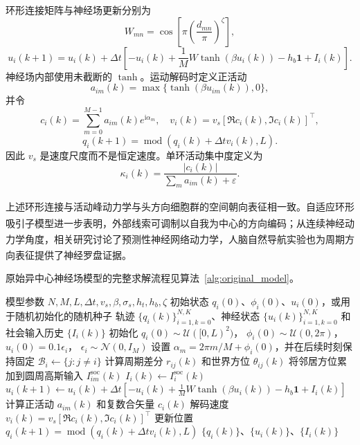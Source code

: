 \documentclass[UTF8,fontset=windows,11pt]{ctexart}
\newcommand{\upcite}[1]{\textsuperscript{\cite{#1}}}
\begin{document}
环形连接矩阵与神经场更新分别为
\begin{equation}
 W_{mn}=\cos\left[\pi\left(\frac{d_{mn}}{\pi}\right)^\zeta\right],
\end{equation}
\begin{equation}
 u_i(k+1)=u_i(k)+\Delta t\left[-u_i(k)+\frac{1}{M}W\tanh(\beta u_i(k))-h_b\bm 1+I_i(k)\right].
\end{equation}
神经场内部使用未截断的 $\tanh$。运动解码时定义正活动
\begin{equation}
 a_{im}(k)=\max\{\tanh(\beta u_{im}(k)),0\},
\end{equation}
并令
\begin{equation}
 c_i(k)=\sum_{m=0}^{M-1}a_{im}(k)e^{\mathrm i\alpha_m},
\quad
 v_i(k)=v_s[\Re c_i(k),\Im c_i(k)]^\top,
\end{equation}
\begin{equation}
 q_i(k+1)=\operatorname{mod}(q_i(k)+\Delta t v_i(k),L).
\end{equation}
因此 $v_s$ 是速度尺度而不是恒定速度。单环活动集中度定义为
\begin{equation}
 \kappa_i(k)=\frac{|c_i(k)|}{\sum_m a_{im}(k)+\varepsilon}.
\end{equation}

上述环形连接与活动峰动力学与头方向细胞群的空间朝向表征\upcite{Zhang1996}相一致。自适应环形吸引子模型进一步表明，外部线索可调制以自我为中心的方向编码\upcite{Chen2026}；从连续神经动力学角度，相关研究讨论了预测性神经网络动力学\upcite{Ao2021}，人脑自然导航实验也为周期方向表征提供了神经罗盘证据\upcite{Lu2025}。

原始异中心神经场模型的完整求解流程见算法~\ref{alg:original_model}。

\begin{algorithm}[htbp]
 \caption{原始异中心神经场集群运动}
 \label{alg:original_model}
 \begin{algorithmic}[1]
 \Require 模型参数 $N,M,L,\Delta t,v_s,\beta,\sigma_s,h_t,h_b,\zeta$
 \Require 初始状态 $q_i(0)$、$\phi_i(0)$、$u_i(0)$，或用于随机初始化的随机种子
 \Ensure 轨迹 $\{q_i(k)\}_{i=1,k=0}^{N,K}$、神经状态 $\{u_i(k)\}_{i=1,k=0}^{N,K}$ 和社会输入历史 $\{I_i(k)\}$
 \State 初始化
 $q_i(0)\sim\mathcal U([0,L)^2)$，
 $\phi_i(0)\sim\mathcal U(0,2\pi)$，
 $u_i(0)=0.1\epsilon_i$，
 $\epsilon_i\sim\mathcal N(0,I_M)$
 \State 设置 $\alpha_m=2\pi m/M+\phi_i(0)$，并在后续时刻保持固定
   \State $\mathcal B_i\leftarrow\{j:j\ne i\}$
    \State 计算周期差分 $r_{ij}(k)$ 和世界方位 $\theta_{ij}(k)$
    \State 将邻居方位累加到圆周高斯输入 $I^{\mathrm{soc}}_{im}(k)$
   \EndFor
   \State $I_i(k)\leftarrow I^{\mathrm{soc}}_{i}(k)$
   \State $u_i(k+1)\leftarrow
   u_i(k)+\Delta t\left[-u_i(k)+\frac{1}{M}W\tanh(\beta u_i(k))-h_b\mathbf 1+I_i(k)\right]$
   \State 计算正活动 $a_{im}(k)$ 和复数合矢量 $c_i(k)$
   \State 解码速度 $v_i(k)=v_s[\Re c_i(k),\Im c_i(k)]^\top$
  \EndFor
   \State 更新位置 $q_i(k+1)=\operatorname{mod}(q_i(k)+\Delta t v_i(k),L)$
  \EndFor
 \EndFor
 \State \Return $\{q_i(k)\}$、$\{u_i(k)\}$、$\{I_i(k)\}$
 \end{algorithmic}
\end{algorithm}
\end{document}
